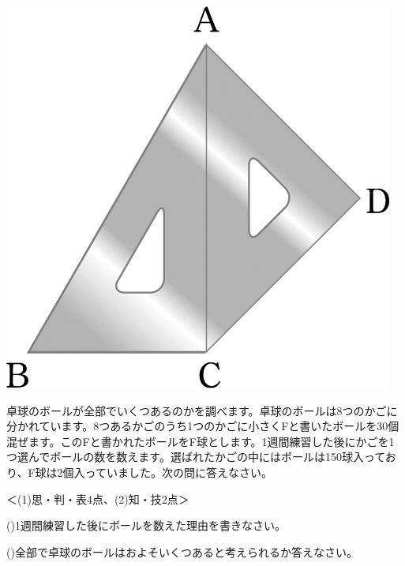 \documentclass[
  12pt,a4paper,lualatex,ja=standard]{bxjsarticle}
\begin{document}
\begin{flushleft}
\begin{multicols}{2}
\begin{center}
\def\@captype{figure}
\includegraphics{media/image36.png}

\end{center}

\end{multicols}

\vfill

\setcounter{skaunta}{0}

\noindent{} \hspace{1pt}卓球のボールが全部でいくつあるのかを調べます。卓球のボールは8つのかごに分かれています。8つあるかごのうち1つのかごに小さくFと書いたボールを30個混ぜます。このFと書かれたボールをF球とします。1週間練習した後にかごを1つ選んでボールの数を数えます。選ばれたかごの中にはボールは150球入っており、F球は2個入っていました。次の問に答えなさい。

%
\begin{flushright}%
\footnotesize{＜(1)思・判・表4点、(2)知・技2点＞}%
\end{flushright}%


()\hspace{2.5pt}1週間練習した後にボールを数えた理由を書きなさい。

()\hspace{2.5pt}全部で卓球のボールはおよそいくつあると考えられるか答えなさい。


\end{flushleft}
\end{document}
